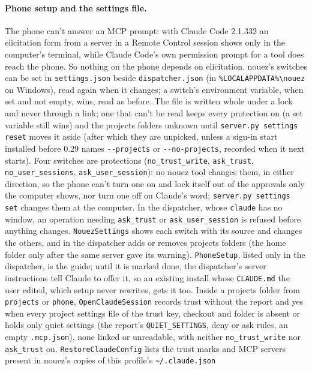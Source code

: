 \documentclass[10pt,a4paper]{article}
\newcommand{\code}[1]{\texttt{#1}}
\begin{document}
\paragraph{Phone setup and the settings file.} The phone can't answer an MCP prompt: with Claude Code
2.1.332 an elicitation form from a server in a Remote Control session shows only in the computer's
terminal, while Claude Code's own permission prompt for a tool does reach the phone. So nothing on the
phone depends on elicitation. nouez's switches can be set in \code{settings.json} beside
\code{dispatcher.json} (in \code{\%LOCALAPPDATA\%\textbackslash nouez} on Windows), read again when it changes; a
switch's environment variable, when set and not empty, wins, read as before. The file is written whole
under a lock and never through a link; one that can't be read keeps every protection on (a set variable still wins) and the
projects folders unknown until \code{server.py settings reset} moves it aside (after which they are unpicked, unless a sign-in
start installed before 0.29 names \code{-{}-projects} or \code{-{}-no-projects}, recorded when it next starts). Four switches are
protections (\code{no\_trust\_write}, \code{ask\_trust}, \code{no\_user\_sessions},
\code{ask\_user\_session}): no nouez tool changes them, in either direction, so the phone can't turn one
on and lock itself out of the approvals only the computer shows, nor turn one off on Claude's word;
\code{server.py settings set} changes them at the computer. In the dispatcher, whose \code{claude} has
no window, an operation needing \code{ask\_trust} or \code{ask\_user\_session} is refused before anything
changes. \code{NouezSettings} shows each switch with its source and changes the others, and in the
dispatcher adds or removes projects folders (the home folder only after the same server gave its
warning). \code{PhoneSetup}, listed only in the dispatcher, is the guide; until it is marked done, the
dispatcher's server instructions tell Claude to offer it, so an existing install whose
\code{CLAUDE.md} the user edited, which setup never rewrites, gets it too. Inside a projects folder from \code{projects} or
\code{phone}, \code{OpenClaudeSession} records trust without the report and yes when every project
settings file of the trust key, checkout and folder is absent or holds only quiet settings (the
report's \code{QUIET\_SETTINGS}, deny or ask rules, an empty \code{.mcp.json}), none linked or
unreadable, with neither \code{no\_trust\_write} nor \code{ask\_trust} on. \code{RestoreClaudeConfig}
lists the trust marks and MCP servers present in nouez's copies of this profile's \code{\textasciitilde/.claude.json}
\end{document}
